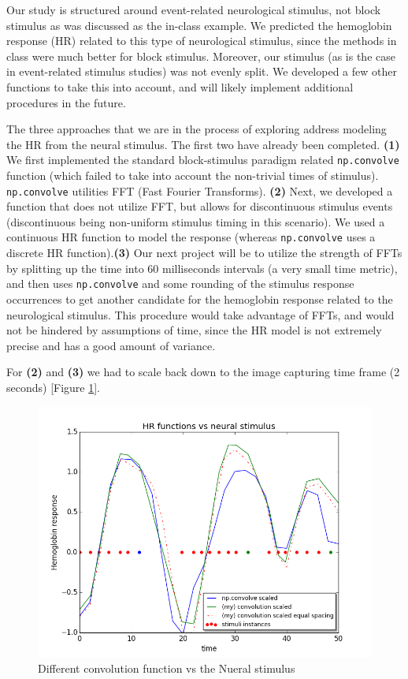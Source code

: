 \par \indent Our study is structured around event-related neurological 
stimulus, not block stimulus as was discussed as the in-class example. We 
predicted the hemoglobin response (HR) related to this type of neurological 
stimulus, since the methods in class were much better for block stimulus. 
Moreover, our stimulus (as is the case in event-related stimulus studies) was 
not evenly split. We developed a few other functions to take this into 
account, and will likely implement additional procedures in the future.

\par The three approaches that we are in the process of exploring address 
modeling the HR from the neural stimulus. The first two have already been 
completed. \textbf{(1)} We first implemented the standard block-stimulus 
paradigm related \texttt{np.convolve} function (which failed to take into 
account the non-trivial times of stimulus). \texttt{np.convolve} utilities 
FFT (Fast Fourier Transforms). \textbf{(2)} Next, we developed a function 
that does not utilize FFT, but allows for discontinuous stimulus events 
(discontinuous being non-uniform stimulus timing in this scenario). We used a 
continuous HR function to model the response (whereas \texttt{np.convolve} 
uses a discrete HR function).\textbf{(3)} Our next project will be to utilize 
the strength of FFTs by splitting up the time into 60 milliseconds intervals 
(a very small time metric), and then uses \texttt{np.convolve} and some 
rounding of the stimulus response occurrences to get another candidate for 
the hemoglobin response related to the neurological stimulus. This procedure 
would take advantage of FFTs, and would not be hindered by assumptions of 
time, since the HR model is not extremely precise and has a good amount of 
variance.
    
\par For \textbf{(2)} and \textbf{(3)} we had to scale back down to the image 
capturing time frame (2 seconds) [Figure \ref{fig:convolution}].

\begin{figure}[ht]
\centering
\includegraphics[scale=0.5]{images/convolution_vs_neural_stimulus} 
\caption{Different convolution function vs the Nueral stimulus}
\label{fig:convolution}
\end{figure}

